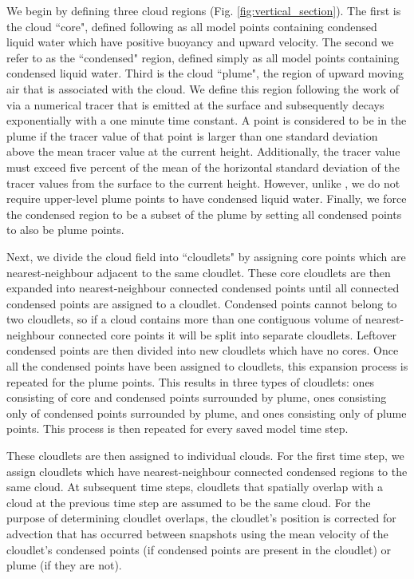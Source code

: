 \documentclass[acp]{copernicus}
\begin{document}
We begin by defining three cloud regions (Fig. \ref{fig:vertical_section}).  
The first is the cloud ``core", defined following \cite{Siebesma1995} as all 
model points containing condensed liquid water which have positive buoyancy and 
upward velocity.  The second we refer to as the ``condensed" region, defined 
simply as all model points containing condensed liquid water.  Third is the 
cloud ``plume", the region of upward moving air that is associated with the 
cloud.  We define this region following the work of \cite{Couvreaux2010} via a 
numerical tracer that is emitted at the surface and subsequently decays 
exponentially with a one minute time constant.  A point is considered to be in 
the plume if the tracer value of that point is larger than one standard 
deviation above the mean tracer value at the current height.  Additionally, 
the tracer value must exceed five percent of the mean of the horizontal 
standard deviation of the tracer values from the surface to the current height.  
However, unlike \citeauthor{Couvreaux2010}, we do not require upper-level 
plume points to have condensed liquid water.  Finally, we force the condensed 
region to be a subset of the plume by setting all condensed points to also be 
plume points.

Next, we divide the cloud field into ``cloudlets" by assigning core points 
which are nearest-neighbour adjacent to the same cloudlet.  These core 
cloudlets are then expanded into nearest-neighbour connected condensed points 
until all connected condensed points are assigned to a cloudlet.  Condensed 
points cannot belong to two cloudlets, so if a cloud contains more than one 
contiguous volume of nearest-neighbour connected core points it will be split 
into separate cloudlets.  Leftover condensed points are then divided into new 
cloudlets which have no cores.  Once all the condensed points have been 
assigned to cloudlets, this expansion process is repeated for the plume points.  
This results in three types of cloudlets: ones consisting of core and condensed 
points surrounded by plume, ones consisting only of condensed points surrounded 
by plume, and ones consisting only of plume points. This process is then 
repeated for every saved model time step.

These cloudlets are then assigned to individual clouds.  For the first time 
step, we assign cloudlets which have nearest-neighbour connected condensed 
regions to the same cloud.  At subsequent time steps, cloudlets that spatially 
overlap with a cloud at the previous time step are assumed to be the same 
cloud.  For the purpose of determining cloudlet overlaps, the cloudlet's 
position is corrected for advection that has occurred between snapshots using 
the mean velocity of the cloudlet's condensed points (if condensed points are 
present in the cloudlet) or plume (if they are not).
\end{document}
